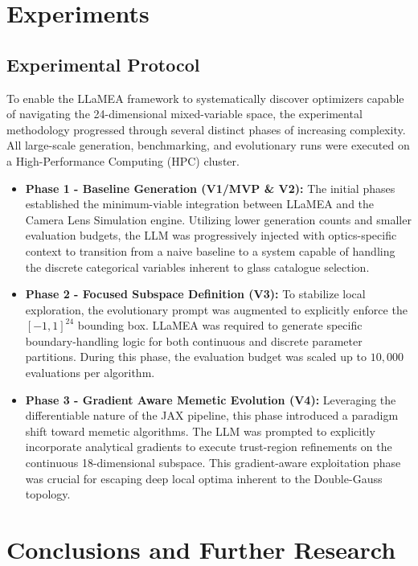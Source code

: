 \documentclass[12pt]{article}
\begin{document}
\section{Experiments}\label{sec:experiments}

\subsection{Experimental Protocol}
To enable the LLaMEA framework to systematically discover optimizers capable of navigating the 24-dimensional mixed-variable space, the experimental methodology progressed through several distinct phases of increasing complexity. All large-scale generation, benchmarking, and evolutionary runs were executed on a High-Performance Computing (HPC) cluster.
\begin{itemize}
    \item \textbf{Phase 1 - Baseline Generation (V1/MVP \& V2):} The initial phases established the minimum-viable integration between LLaMEA and the Camera Lens Simulation engine. Utilizing lower generation counts and smaller evaluation budgets, the LLM was progressively injected with optics-specific context to transition from a naive baseline to a system capable of handling the discrete categorical variables inherent to glass catalogue selection.
    \item \textbf{Phase 2 - Focused Subspace Definition (V3):} To stabilize local exploration, the evolutionary prompt was augmented to explicitly enforce the $[-1, 1]^{24}$ bounding box. LLaMEA was required to generate specific boundary-handling logic for both continuous and discrete parameter partitions. During this phase, the evaluation budget was scaled up to $10,000$ evaluations per algorithm.
    \item \textbf{Phase 3 - Gradient Aware Memetic Evolution (V4):} Leveraging the differentiable nature of the JAX pipeline, this phase introduced a paradigm shift toward memetic algorithms. The LLM was prompted to explicitly incorporate analytical gradients to execute trust-region refinements on the continuous 18-dimensional subspace. This gradient-aware exploitation phase was crucial for escaping deep local optima inherent to the Double-Gauss topology.
\end{itemize}


\section{Conclusions and Further Research}\label{sec:conclusions}





\end{document}
